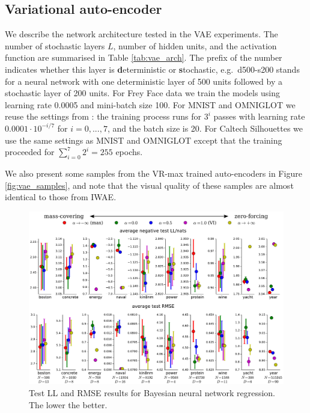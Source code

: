 \subsection{Variational auto-encoder}
We describe the network architecture tested in the VAE experiments. The number of stochastic layers $L$, number of hidden units, and the activation function are summarised in Table \ref{tab:vae_arch}. The prefix of the number indicates whether this layer is \textbf{d}eterministic or \textbf{s}tochastic, e.g.~d500-s200 stands for a neural network with one deterministic layer of 500 units followed by a stochastic layer of 200 units. For Frey Face data we train the models using learning rate 0.0005 and mini-batch size 100. For MNIST and OMNIGLOT we reuse the settings from \cite{burda:iwae}: the training process runs for $3^i$ passes with learning rate $0.0001 \cdot 10^{-i/7}$ for $i = 0, ..., 7$, and the batch size is 20. For Caltech Silhouettes we use the same settings as MNIST and OMNIGLOT except that the training proceeded for $\sum_{i=0}^7 2^i = 255$ epochs.

We also present some samples from the VR-max trained auto-encoders in Figure \ref{fig:vae_samples}, and note that the visual quality of these samples are almost identical to those from IWAE.

\begin{figure}[ht]
\centering
    \includegraphics[width=1\linewidth]{../figs/results_all_bnn.pdf}
    \caption{Test LL and RMSE results for Bayesian neural network regression. The lower the better.}
    \label{fig:bnn_results_all}



       
\end{figure}

